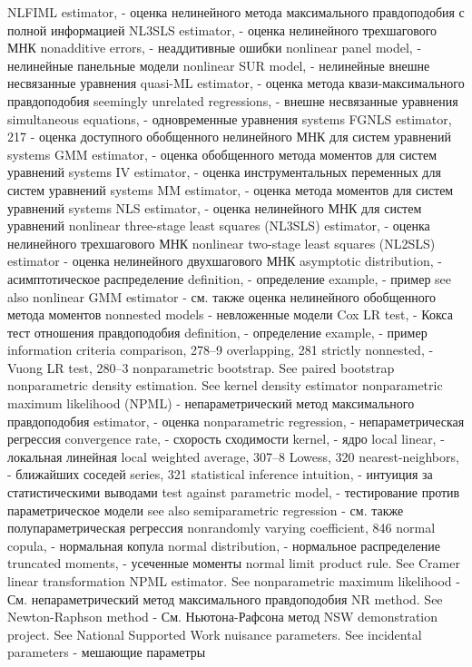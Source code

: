 NLFIML estimator, - оценка нелинейного метода максимального правдоподобия с полной информацией
NL3SLS estimator, - оценка нелинейного трехшагового МНК
nonadditive errors, - неаддитивные ошибки
nonlinear panel model, - нелинейные панельные модели
nonlinear SUR model, - нелинейные внешне несвязанные уравнения
quasi-ML estimator, - оценка метода квази-максимального правдоподобия
seemingly unrelated regressions, - внешне несвязанные уравнения
simultaneous equations, - одновременные уравнения
systems FGNLS estimator, 217 - оценка доступного обобщенного нелинейного МНК для систем уравнений
systems GMM estimator, - оценка обобщенного метода моментов для систем уравнений 
systems IV estimator, - оценка инструментальных переменных для систем уравнений
systems MM estimator, - оценка метода моментов для систем уравнений
systems NLS estimator, - оценка нелинейного МНК для систем уравнений
nonlinear three-stage least squares (NL3SLS) estimator, - оценка нелинейного трехшагового МНК 
nonlinear two-stage least squares (NL2SLS) estimator - оценка нелинейного двухшагового МНК
asymptotic distribution, - асимптотическое распределение
definition, - определение
example, - пример
see also nonlinear GMM estimator  - см. также оценка нелинейного обобщенного метода моментов
nonnested models - невложенные модели
Cox LR test, - Кокса тест отношения правдоподобия
definition, - определение
example, - пример
information criteria comparison, 278–9 
overlapping, 281
strictly nonnested, - 
Vuong LR test, 280–3
nonparametric bootstrap. See paired bootstrap nonparametric density estimation. See kernel density
estimator
nonparametric maximum likelihood (NPML) - непараметрический метод максимального правдоподобия
estimator, - оценка
nonparametric regression, - непараметрическая регрессия
convergence rate, - схорость сходимости
kernel, - ядро
local linear, - локальная линейная
local weighted average, 307–8 
Lowess, 320
nearest-neighbors, - ближайших соседей
series, 321
statistical inference intuition, - интуиция за статистическими выводами
test against parametric model, - тестирование против параметрическое модели
see also semiparametric regression - см. также полупараметрическая регрессия
nonrandomly varying coefficient, 846 
normal copula, - нормальная копула
normal distribution, - нормальное распределение
truncated moments, - усеченные моменты
normal limit product rule. See Cramer linear
transformation
NPML estimator. See nonparametric maximum likelihood - См. непараметрический метод максимального правдоподобия
NR method. See Newton-Raphson method - См. Ньютона-Рафсона метод
NSW demonstration project. See National Supported
Work
nuisance parameters. See incidental parameters - мешающие параметры

